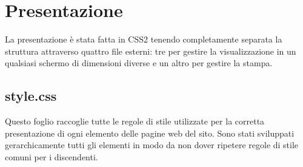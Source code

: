 \section{Presentazione}
La presentazione è stata fatta in CSS2 tenendo completamente separata la struttura attraverso quattro file esterni: tre per gestire la visualizzazione in un qualsiasi schermo di dimensioni diverse e un altro per
gestire la stampa.
\subsection{style.css}
Questo foglio raccoglie tutte le regole di stile utilizzate per la corretta presentazione di ogni elemento delle pagine web del sito. Sono stati sviluppati gerarchicamente tutti gli elementi in modo da non dover ripetere regole di stile comuni per i discendenti.